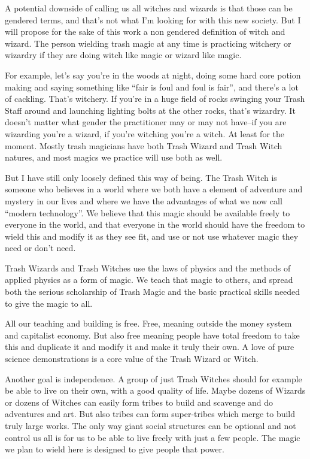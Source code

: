 A potential downside of calling us all witches and wizards is that those
can be gendered terms, and that's not what I'm looking for with this new
society. But I will propose for the sake of this work a non gendered
definition of witch and wizard. The person wielding trash magic at any
time is practicing witchery or wizardry if they are doing witch like
magic or wizard like magic.

For example, let's say you're in the woods at night, doing some hard
core potion making and saying something like ``fair is foul and foul is
fair'', and there's a lot of cackling. That's witchery. If you're in a
huge field of rocks swinging your Trash Staff around and launching
lighting bolts at the other rocks, that's wizardry. It doesn't matter
what gender the practitioner may or may not have--if you are wizarding
you're a wizard, if you're witching you're a witch. At least for the
moment. Mostly trash magicians have both Trash Wizard and Trash Witch
natures, and most magics we practice will use both as well.

But I have still only loosely defined this way of being. The Trash Witch
is someone who believes in a world where we both have a element of
adventure and mystery in our lives and where we have the advantages of
what we now call ``modern technology''. We believe that this magic
should be available freely to everyone in the world, and that everyone
in the world should have the freedom to wield this and modify it as they
see fit, and use or not use whatever magic they need or don't need.

Trash Wizards and Trash Witches use the laws of physics and the methods
of applied physics as a form of magic. We teach that magic to others,
and spread both the serious scholarship of Trash Magic and the basic
practical skills needed to give the magic to all.

All our teaching and building is free. Free, meaning outside the money
system and capitalist economy. But also free meaning people have total
freedom to take this and duplicate it and modify it and make it truly
their own. A love of pure science demonstrations is a core value of the
Trash Wizard or Witch.

Another goal is independence. A group of just Trash Witches should for
example be able to live on their own, with a good quality of life. Maybe
dozens of Wizards or dozens of Witches can easily form tribes to build
and scavenge and do adventures and art. But also tribes can form
super-tribes which merge to build truly large works. The only way giant
social structures can be optional and not control us all is for us to be
able to live freely with just a few people. The magic we plan to wield
here is designed to give people that power.

